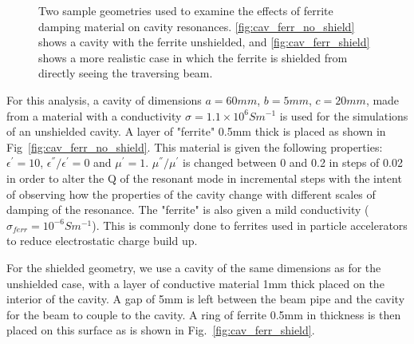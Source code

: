 \begin{figure}
\caption{Two sample geometries used to examine the effects of ferrite damping material on cavity resonances. \ref{fig:cav_ferr_no_shield} shows a cavity with the ferrite unshielded, and \ref{fig:cav_ferr_shield} shows a more realistic case in which the ferrite is shielded from directly seeing the traversing beam.}
\label{fig:ferr_cav_res}
\end{figure}

For this analysis, a cavity of dimensions $a=60mm$, $b=5mm$, $c=20mm$, made from a material with a conductivity $\sigma = 1.1 \times 10^{6} S m^{-1}$ is used for the simulations of an unshielded cavity. A layer of "ferrite" 0.5mm thick is placed as shown in Fig~\ref{fig:cav_ferr_no_shield}. This material is given the following properties: $\epsilon^{'} = 10$, $\epsilon^{''}/\epsilon^{'} = 0$ and $\mu^{'}=1$. $\mu^{''}/ \mu^{'}$ is changed between 0 and 0.2 in steps of 0.02 in order to alter the Q of the resonant mode in incremental steps with the intent of observing how the properties of the cavity change with different scales of damping of the resonance. The "ferrite" is also given a mild conductivity ($\sigma_{ferr} = 10^{-6} S m^{-1}$). This is commonly done to ferrites used in particle accelerators to reduce electrostatic charge build up. 

For the shielded geometry, we use a cavity of the same dimensions as for the unshielded case, with a layer of conductive material 1mm thick placed on the interior of the cavity. A gap of 5mm is left between the beam pipe and the cavity for the beam to couple to the cavity. A ring of ferrite 0.5mm in thickness is then placed on this surface as is shown in Fig.~\ref{fig:cav_ferr_shield}.

